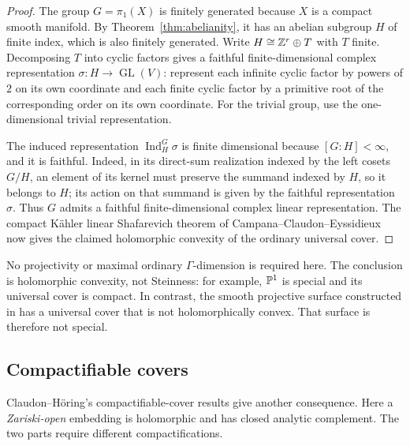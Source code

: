 \begin{proof}
The group \(G=\pi_1(X)\) is finitely generated because \(X\) is a compact
smooth manifold. By Theorem~\ref{thm:abelianity}, it has an abelian
subgroup \(H\) of finite index, which is also finitely generated.
Write \(H\cong\mathbb Z^r\oplus T\) with \(T\) finite. Decomposing \(T\) into
cyclic factors gives a faithful finite-dimensional complex
representation \(\sigma:H\to\operatorname{GL}(V)\): represent each
infinite cyclic factor by powers of \(2\) on its own coordinate and
each finite cyclic factor by a primitive root of the corresponding
order on its own coordinate.
For the trivial group, use the one-dimensional trivial representation.

The induced representation \(\operatorname{Ind}_H^G\sigma\) is finite
dimensional because \([G:H]<\infty\), and it is faithful. Indeed, in
its direct-sum realization indexed by the left cosets \(G/H\), an
element of its kernel must preserve the summand indexed by \(H\), so
it belongs to \(H\); its action on that summand is given by the faithful
representation \(\sigma\). Thus \(G\) admits a faithful finite-dimensional
complex linear representation. The compact K\"ahler linear Shafarevich theorem
of Campana--Claudon--Eyssidieux
\cite[author's version, Corollary~5.9]{CCE2015} now gives the claimed
holomorphic convexity of the ordinary universal cover.
\end{proof}

No projectivity or maximal ordinary \(\Gamma\)-dimension is required
here. The conclusion is holomorphic convexity, not Steinness: for
example, \(\mathbb P^1\) is special and its universal cover is compact.
In contrast, the smooth projective surface constructed in
\cite{OpenAIShafarevich2026} has a universal cover that is not
holomorphically convex. That surface is therefore not special.

\subsection{Compactifiable covers}

Claudon--H\"oring's compactifiable-cover results give another
consequence. Here a \emph{Zariski-open} embedding is holomorphic and
has closed analytic complement. The two parts require different
compactifications.

